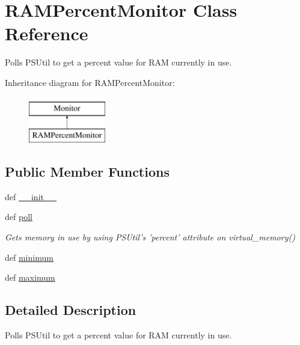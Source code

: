 \hypertarget{classsrc_1_1client_1_1_ram_percent_monitor_1_1_r_a_m_percent_monitor}{\section{R\-A\-M\-Percent\-Monitor Class Reference}
\label{classsrc_1_1client_1_1_ram_percent_monitor_1_1_r_a_m_percent_monitor}
}


Polls P\-S\-Util to get a percent value for R\-A\-M currently in use.  


Inheritance diagram for R\-A\-M\-Percent\-Monitor\-:\begin{figure}[H]
\begin{center}
\leavevmode
\includegraphics[height=2.000000cm]{classsrc_1_1client_1_1_ram_percent_monitor_1_1_r_a_m_percent_monitor}
\end{center}
\end{figure}
\subsection*{Public Member Functions}
\begin{DoxyCompactItemize}
\item 
def \hyperlink{classsrc_1_1client_1_1_ram_percent_monitor_1_1_r_a_m_percent_monitor_ac775ee34451fdfa742b318538164070e}{\-\_\-\-\_\-init\-\_\-\-\_\-}
\item 
def \hyperlink{classsrc_1_1client_1_1_ram_percent_monitor_1_1_r_a_m_percent_monitor_a87cd0076a6d482a01482f25a64cf2fb4}{poll}
\begin{DoxyCompactList}\small\item\em Gets memory in use by using P\-S\-Util's 'percent' attribute on virtual\-\_\-memory() \end{DoxyCompactList}\item 
def \hyperlink{classsrc_1_1client_1_1_ram_percent_monitor_1_1_r_a_m_percent_monitor_a4515aa6e0be4391413959391fef1109f}{minimum}
\item 
def \hyperlink{classsrc_1_1client_1_1_ram_percent_monitor_1_1_r_a_m_percent_monitor_a8f6589fdc9d322ec8e0dc2c7ede55ce9}{maximum}
\end{DoxyCompactItemize}


\subsection{Detailed Description}
Polls P\-S\-Util to get a percent value for R\-A\-M currently in use. 

